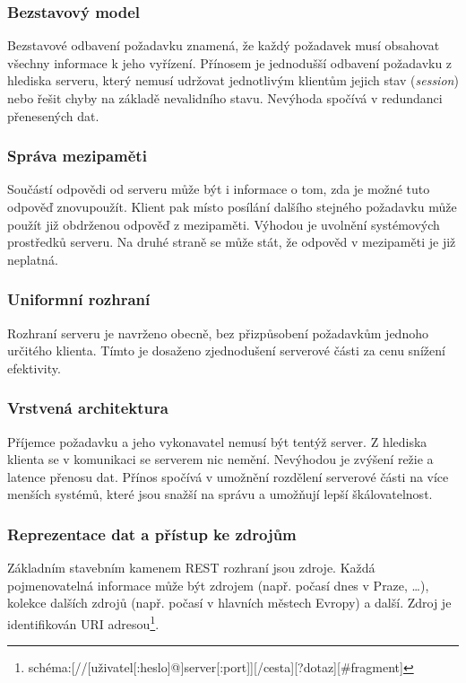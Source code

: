 \subsubsection{Bezstavový model}

Bezstavové odbavení požadavku znamená, že každý požadavek musí obsahovat všechny informace k jeho vyřízení.
Přínosem je jednodušší odbavení požadavku z hlediska serveru, který nemusí udržovat jednotlivým klientům jejich stav (\textit{session}) nebo řešit chyby na základě nevalidního stavu.
Nevýhoda spočívá v redundanci přenesených dat.
\cite{rest_bezstavovy}

\subsubsection{Správa mezipaměti}

Součástí odpovědi od serveru může být i informace o tom, zda je možné tuto odpověď znovupoužít.
Klient pak místo posílání dalšího stejného požadavku může použít již obdrženou odpověď z mezipaměti.
Výhodou je uvolnění systémových prostředků serveru.
Na druhé straně se může stát, že odpověd v mezipaměti je již neplatná.
\cite{rest_mezipamet}

\subsubsection{Uniformní rozhraní}

Rozhraní serveru je navrženo obecně, bez přizpůsobení požadavkům jednoho určitého klienta.
Tímto je dosaženo zjednodušení serverové části za cenu snížení efektivity.
\cite{rest_uniformni}

\subsubsection{Vrstvená architektura}

Příjemce požadavku a jeho vykonavatel nemusí být tentýž server.
Z hlediska klienta se v komunikaci se serverem nic nemění.
Nevýhodou je zvýšení režie a latence přenosu dat.
Přínos spočívá v umožnění rozdělení serverové části na více menších systémů, které jsou snažší na správu a umožňují lepší škálovatelnost.
\cite{rest_architektura}

\subsubsection{Reprezentace dat a přístup ke zdrojům}

Základním stavebním kamenem REST rozhraní jsou zdroje.
Každá pojmenovatelná informace může být zdrojem (např. počasí dnes v Praze, \ldots), kolekce dalších zdrojů (např. počasí v hlavních městech Evropy) a další.
Zdroj je identifikován URI adresou\footnote{schéma:[//[uživatel[:heslo]@]server[:port]][/cesta][?dotaz][\#fragment]}.
\cite{rest_zdroje}

